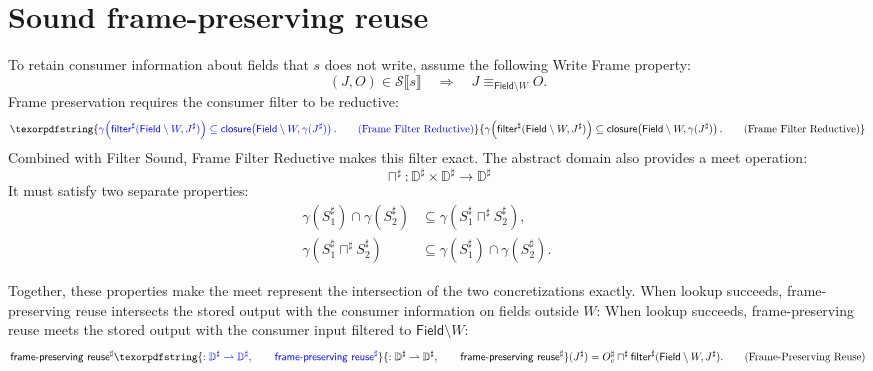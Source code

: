 \documentclass[10pt]{article}
\newcommand{\REV}[1]{{\color{reviewpink}#1}}
\newcommand{\Field}{\mathsf{Field}}
\newcommand{\Semantics}[1]{\mathcal S\mathopen{⟦}#1\mathclose{⟧}}
\newcommand{\ProjClose}{\mathsf{closure}}
\newcommand{\filter}{\mathsf{filter}}
\newcommand{\frameReuse}{\mathsf{frame\text{-}preserving\ reuse}}
\newcommand{\agree}[1]{\mathrel{\equiv_{#1}}}
\providecommand{\DIFaddtex}[1]{{\protect\color{blue} #1}} %
\providecommand{\DIFdeltex}[1]{{\protect\color{red} \scriptsize #1}} %
\providecommand{\DIFaddbegin}{} %
\providecommand{\DIFaddend}{} %
\providecommand{\DIFdelbegin}{} %
\providecommand{\DIFdelend}{} %
\providecommand{\DIFadd}[1]{\texorpdfstring{\DIFaddtex{#1}}{#1}} %
\providecommand{\DIFdel}[1]{\texorpdfstring{\DIFdeltex{#1}}{}} %
\begin{document}
\section{Sound frame-preserving reuse}

To retain consumer information about fields that \(s\) does not write, assume the following
Write Frame property:
\[
  (J,O)\in\Semantics{s}
  \quad\Longrightarrow\quad
  J\agree{\Field\setminus W}O.
  \tag{Write Frame}
\]
\DIFaddbegin \DIFadd{\REV{Frame preservation requires the consumer filter to be reductive:}
}\[
  \DIFadd{\gamma\!\left(\filter^\sharp(\Field\setminus W,J^\sharp)\right)
  \subseteq
  \ProjClose\!\left(\Field\setminus W,\gamma(J^\sharp)\right).
  \tag{Frame Filter Reductive}
}\]
\DIFadd{\REV{Combined with Filter Sound, Frame Filter Reductive makes this filter exact.}
}\DIFaddend The abstract domain also provides a meet operation:
\[
  \sqcap^\sharp:\mathbb D^\sharp\times\mathbb D^\sharp\to\mathbb D^\sharp
\]
It must satisfy two separate properties:
\begin{align*}
  \gamma(S_1^\sharp)\cap\gamma(S_2^\sharp)
  &\subseteq\gamma(S_1^\sharp\sqcap^\sharp S_2^\sharp),
  &&\tag{Meet Sound}\\
  \gamma(S_1^\sharp\sqcap^\sharp S_2^\sharp)
  &\subseteq\gamma(S_1^\sharp)\cap\gamma(S_2^\sharp).
  &&\tag{Meet Reductive}
\end{align*}

\DIFdelbegin \DIFdel{Together, these properties make the meet represent the intersection of the two concretizations
exactly. When lookup succeeds, frame-preserving reuse intersects the stored output with the
consumer information on fields outside \(W\):
}\DIFdelend \DIFaddbegin \DIFadd{\REV{When lookup succeeds, frame-preserving reuse meets the stored output with the consumer input
filtered to \(\Field\setminus W\):}
}\DIFaddend \[
  \frameReuse^\sharp\DIFaddbegin \DIFadd{:\mathbb D^\sharp\rightharpoonup\mathbb D^\sharp,
  \qquad
  \frameReuse^\sharp}\DIFaddend (J^\sharp)
  =O_c^\sharp\sqcap^\sharp
    \filter^\sharp(\Field\setminus W,J^\sharp).
  \tag{Frame-Preserving Reuse}
\]
\end{document}
